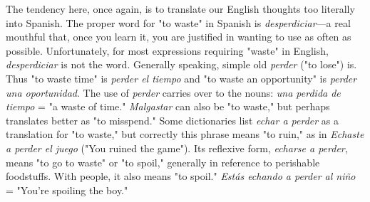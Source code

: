 The tendency here, once again, is to translate our English
thoughts too literally into Spanish. The proper word for "to waste" in
Spanish is \emph{desperdiciar}---a real mouthful that, once you learn it, you
are justified in wanting to use as often as possible. Unfortunately, for
most expressions requiring "waste" in English, \emph{desperdiciar} is not the
word. Generally speaking, simple old \emph{perder} ("to lose") is. Thus "to
waste time" is \emph{perder el tiempo} and "to waste an opportunity" is \emph{perder una oportunidad}. The use of \emph{perder} carries over to the nouns: \emph{una
perdida de tiempo} = "a waste of time." \emph{Malgastar} can also be "to
waste," but perhaps translates better as "to misspend." Some dictionaries list \emph{echar a perder} as a translation for "to waste," but correctly
this phrase means "to ruin," as in \emph{Echaste a perder el juego} ("You ruined the game"). Its reflexive form, \emph{echarse a perder}, means "to go to
waste" or "to spoil," generally in reference to perishable foodstuffs.
With people, it also means "to spoil." \emph{Estás echando a perder al niño}
= "You're spoiling the boy."

